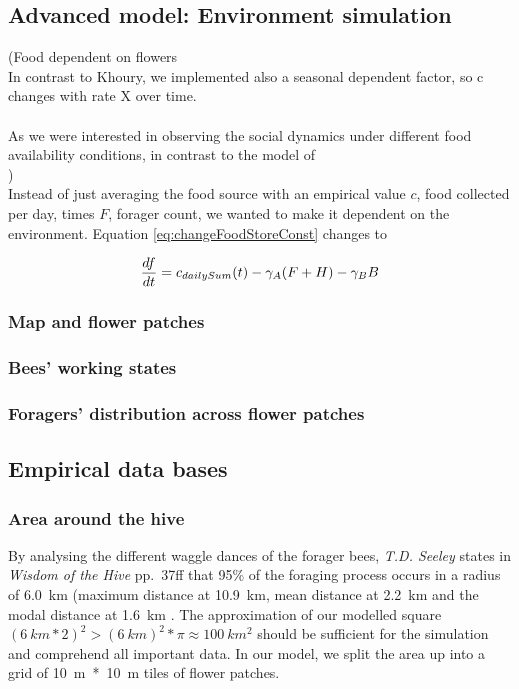 	\subsection{Advanced model: Environment simulation}\label{subsec:advancedModel}
		
		(Food dependent on flowers\\
		In contrast to Khoury, we implemented also a seasonal dependent factor, so c changes with rate X over time. \\
		\\
		As we were interested in observing the social dynamics under different food availability conditions, in contrast to the model of 
		\\)
		\\
		Instead of just averaging the food source with an empirical value $c$, food collected per day, times $F$, forager count, we wanted to make it dependent on the environment. Equation \ref{eq:changeFoodStoreConst} changes to 
		
		\begin{equation}\label{eq:changeFoodStoreDyn}
			{df \over dt} = c_{dailySum}(t) - \gamma_A (F+H) - \gamma_B B
		\end{equation}
		
				
		 
		\subsubsection{Map and flower patches}
		
		\subsubsection{Bees' working states}
			
		
		\subsubsection{Foragers' distribution across flower patches}
		
		
	\subsection{Empirical data bases}
		\subsubsection{Area around the hive}
			By analysing the different waggle dances of the forager bees, \textit{T.D. Seeley} states in \textit{Wisdom of the Hive} pp.~37ff that 95\% of the foraging process occurs in a radius of 6.0~km (maximum distance at 10.9~km, mean distance at 2.2~km and the modal distance at 1.6~km \cite{seeley95}. The approximation of our modelled square $(6~km * 2)^2 > (6~km)^2*\pi \approx 100~km^2$ should be sufficient for the simulation and comprehend all important data. In our model, we split the area up into a grid of 10~m~*~10~m tiles of flower patches.
